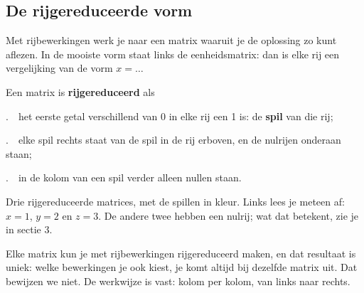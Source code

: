 \subsection{De rijgereduceerde vorm}

Met rijbewerkingen werk je naar een matrix waaruit je de oplossing zo kunt aflezen. In de mooiste vorm staat links de eenheidsmatrix: dan is elke rij een vergelijking van de vorm $x = \ldots$

\begin{theorie}
Een matrix is \textbf{\textcolor{accent}{rijgereduceerd}} als

\vspace{1mm}
.\ \ het eerste getal verschillend van 0 in elke rij een 1 is: de \textbf{\textcolor{accent}{spil}} van die rij;

.\ \ elke spil rechts staat van de spil in de rij erboven, en de nulrijen onderaan staan;

.\ \ in de kolom van een spil verder alleen nullen staan.
\end{theorie}


Drie rijgereduceerde matrices, met de spillen in kleur. Links lees je meteen af: $x = 1$, $y = 2$ en $z = 3$. De andere twee hebben een nulrij; wat dat betekent, zie je in sectie 3.

\begin{oefeningen}
\end{oefeningen}

Elke matrix kun je met rijbewerkingen rijgereduceerd maken, en dat resultaat is uniek: welke bewerkingen je ook kiest, je komt altijd bij dezelfde matrix uit. Dat bewijzen we niet. De werkwijze is vast: kolom per kolom, van links naar rechts.

